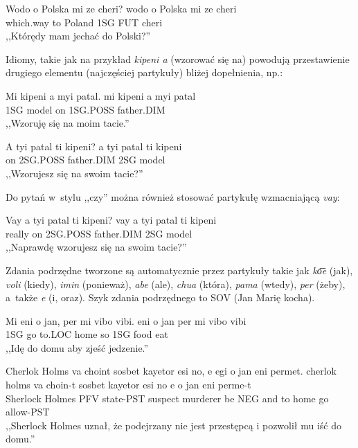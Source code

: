 \begin{spacing}{1.1}
\begin{exe}
	\ex
	\trans Wodo o Polska mi ze cheri?
	\gll wodo o Polska mi ze cheri\\
	  which.way to Poland 1SG FUT cheri\\
	\glt  ,,Którędy mam jechać do Polski?''
\end{exe}

Idiomy, takie jak na przykład \emph{kipeni a} (wzorować się na) powodują
przestawienie drugiego elementu (najczęściej partykuły) bliżej dopełnienia, np.:

\begin{exe}
	\ex
	\trans Mi kipeni a myi patal.
	\gll mi kipeni a myi patal\\
	  1SG model on 1SG.POSS father.DIM\\
	\glt  ,,Wzoruję się na moim tacie.''
\end{exe}

\begin{exe}
	\ex
	\trans A tyi patal ti kipeni?
	\gll a tyi patal ti kipeni\\
	  on 2SG.POSS father.DIM 2SG model\\
	\glt  ,,Wzorujesz się na swoim tacie?''
\end{exe}

Do pytań w~stylu ,,czy'' można również stosować partykułę wzmacniającą
\emph{vay}:

\begin{exe}
	\ex
	\trans Vay a tyi patal ti kipeni?
	\gll vay a tyi patal ti kipeni\\
	  really on 2SG.POSS father.DIM 2SG model\\
	\glt  ,,Naprawdę wzorujesz się na swoim tacie?''
\end{exe}

Zdania podrzędne tworzone są automatycznie przez partykuły takie jak \emph{ko͞e} 
(jak), \emph{voli} (kiedy), \emph{imin} (ponieważ), \emph{abe} (ale), 
\emph{chua} (która), \emph{pama} (wtedy), \emph{per} (żeby), a~także \emph{e} 
(i, oraz). Szyk zdania podrzędnego to SOV (Jan Marię kocha).

\begin{exe}
	\ex
	\trans Mi eni o jan, per mi vibo vibi.
	\gll eni o jan per mi vibo vibi\\
	  1SG go to.LOC home so 1SG food eat\\
	\glt  ,,Idę do domu aby zjeść jedzenie.''
\end{exe}

\begin{exe}
	\ex
	\trans Cherlok Holms va choint sosbet kayetor esi no, e egi o jan eni permet.
	\gll cherlok holms va choin-t sosbet kayetor esi no e o jan eni perme-t\\
	  Sherlock Holmes PFV state-PST suspect murderer be NEG and to home go allow-PST\\
	\glt  ,,Sherlock Holmes uznał, że podejrzany nie jest przestępcą i pozwolił mu iść do domu.''
\end{exe}


\end{spacing}
